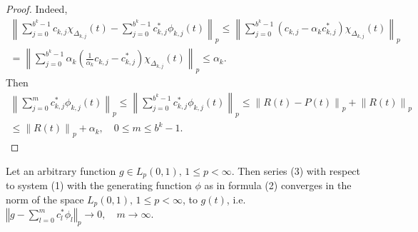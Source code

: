 \documentclass[
11pt,%
tightenlines,%
twoside,%
onecolumn,%
nofloats,%
nobibnotes,%
nofootinbib,%
superscriptaddress,%
noshowpacs,%
centertags]%
{revtex4}
\begin{document}
\begin{proof}
 Indeed,
\begin{multline*}
    \left\|  \sum_{j=0}^{b^k-1} c_{k,j} \chi_{\Delta_{k,j}}(t)-
    \sum_{j=0}^{b^k-1} c^{\ast }_{k,j} \phi_{k,j}(t) \right\|_p \le
    \left\|  \sum_{j=0}^{b^k-1}\left(  c_{k,j}-\alpha_k
    c^{\ast}_{k,j}\right)  \chi_{\Delta_{k,j}}(t)\right\|_p
    \\
    =\left\|  \sum_{j=0}^{b^k-1}   \alpha_k \left( \frac{1}{\alpha_k}
    c_{k,j}- c^{\ast}_{k,j}\right)  \chi_{\Delta_{k,j}}(t)\right\|_p
    \le \alpha_k.
\end{multline*}
Then
\begin{multline*}
    \left\|  \sum_{j=0}^{m} c^{\ast}_{k,j} \phi_{k,j}(t) \right\|_p
    \le \left\|  \sum_{j=0}^{b^k-1} c^{\ast}_{k,j} \phi_{k,j}(t)
    \right\|_p  \le\left\| R(t) - P(t) \right\|_p+\left\|
    R(t)\right\|_p \\ \le \left\| R(t)\right\|_p + \alpha_k, \quad
    0\le m \le b^k-1.
\end{multline*}
\end{proof}
    \medskip
\begin{theorem} %
    Let an arbitrary function $ g \in L_p
    (0,1), \, 1 \leq p <\infty $. Then series (3) with respect to
    system  (1) with the generating function $ \phi $ as in formula
    (2) converges in the norm of the space  $  L_p(0,1), \, 1 \leq p <
    \infty  $, to $ g(t) $, i.e. $ \left\Vert g- \sum_{l=0}^{m}
    c^{\ast}_l  \phi_l \right\Vert_p \to 0,\quad m\to \infty
    $.
\end{theorem}
\end{document}
